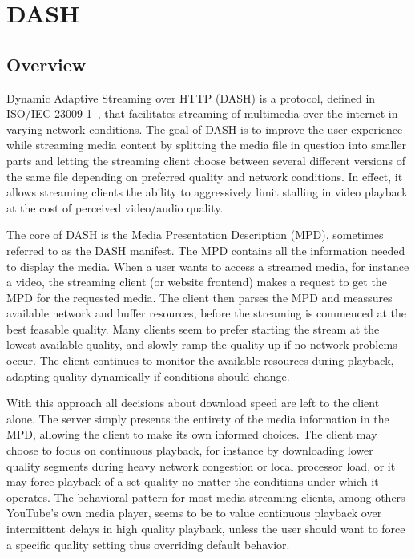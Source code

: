 \section{DASH}

\subsection{Overview}

Dynamic Adaptive Streaming over HTTP (DASH) is a protocol, defined in
ISO/IEC 23009-1~\cite{ISO/IEC 23009-1:2014}, that facilitates 
streaming of multimedia over the internet in varying network conditions.
The goal of DASH is to improve the user
experience while streaming media content by splitting the media file in question
into smaller parts and letting the streaming client choose between several
different versions of the same file depending on preferred quality and network
conditions. In effect, it allows streaming clients the ability to aggressively
limit stalling in video playback at the cost of perceived video/audio quality.

The core of DASH is the Media Presentation Description (MPD), sometimes
referred to as the DASH manifest. The MPD contains all the information
needed to display the media. When a user wants to access a streamed
media, for instance a video, the streaming client (or website frontend)
makes a request to get the MPD for the requested media. The client then
parses the MPD and meassures available network and buffer resources,
before the streaming is commenced at the best feasable quality. Many clients %
seem to prefer starting the stream at the lowest available quality, and
slowly ramp the quality up if no network problems occur. The
client continues to monitor the available resources during playback, adapting
quality dynamically if conditions should change.

With this approach all decisions about download speed are left to the client
alone.
The server simply presents the entirety of the media information in the MPD,
allowing the client to make its own informed choices. The client may choose
to focus on continuous playback, for instance by downloading lower quality
segments during heavy network congestion or local processor load, or it may
force playback of a set quality no matter the conditions under which it
operates. The behavioral pattern for most media streaming clients, among
others YouTube's own media player, seems to be to value continuous playback
over intermittent delays in high quality playback, unless the user should want
to force a specific quality setting thus overriding default behavior.

